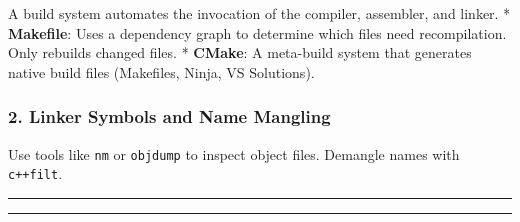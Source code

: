 A build system automates the invocation of the compiler, assembler, and
linker. * \textbf{Makefile}: Uses a dependency graph to determine which
files need recompilation. Only rebuilds changed files. * \textbf{CMake}:
A meta-build system that generates native build files (Makefiles, Ninja,
VS Solutions).

\hypertarget{linker-symbols-and-name-mangling}{%
\subsubsection{2. Linker Symbols and Name
Mangling}\label{linker-symbols-and-name-mangling}}

Use tools like \passthrough{\lstinline!nm!} or
\passthrough{\lstinline!objdump!} to inspect object files. Demangle
names with \passthrough{\lstinline!c++filt!}.

\begin{center}\rule{0.5\linewidth}{0.5pt}\end{center}

\begin{center}\rule{0.5\linewidth}{0.5pt}\end{center}
